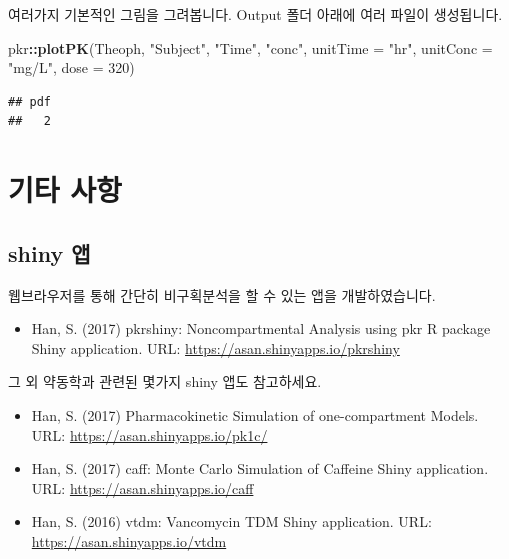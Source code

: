 \documentclass[12pt,]{krantz}
\newenvironment{Shaded}{\begin{snugshade}}{\end{snugshade}}
\newcommand{\KeywordTok}[1]{\textcolor[rgb]{0.13,0.29,0.53}{\textbf{#1}}}
\newcommand{\DataTypeTok}[1]{\textcolor[rgb]{0.13,0.29,0.53}{#1}}
\newcommand{\DecValTok}[1]{\textcolor[rgb]{0.00,0.00,0.81}{#1}}
\newcommand{\StringTok}[1]{\textcolor[rgb]{0.31,0.60,0.02}{#1}}
\newcommand{\OperatorTok}[1]{\textcolor[rgb]{0.81,0.36,0.00}{\textbf{#1}}}
\newcommand{\NormalTok}[1]{#1}
\providecommand{\tightlist}{%
  \setlength{\itemsep}{0pt}\setlength{\parskip}{0pt}}
\begin{document}
여러가지 기본적인 그림을 그려봅니다. Output 폴더 아래에 여러 파일이
생성됩니다.

\begin{Shaded}
\begin{Highlighting}[]
\NormalTok{pkr}\OperatorTok{::}\KeywordTok{plotPK}\NormalTok{(Theoph, }\StringTok{"Subject"}\NormalTok{, }\StringTok{"Time"}\NormalTok{, }\StringTok{"conc"}\NormalTok{, }
            \DataTypeTok{unitTime =} \StringTok{"hr"}\NormalTok{, }\DataTypeTok{unitConc =} \StringTok{"mg/L"}\NormalTok{, }\DataTypeTok{dose =} \DecValTok{320}\NormalTok{)}
\end{Highlighting}
\end{Shaded}

\begin{verbatim}
## pdf 
##   2
\end{verbatim}

\hypertarget{etc}{%
\chapter{기타 사항}\label{etc}}

\hypertarget{shiny-}{%
\section{shiny 앱}\label{shiny-}}

웹브라우저를 통해 간단히 비구획분석을 할 수 있는 앱을 개발하였습니다.

\begin{itemize}
\tightlist
\item
  Han, S. (2017) pkrshiny: Noncompartmental Analysis using pkr R package
  Shiny application. URL: \url{https://asan.shinyapps.io/pkrshiny}
\end{itemize}

그 외 약동학과 관련된 몇가지 shiny 앱도 참고하세요.

\begin{itemize}
\tightlist
\item
  Han, S. (2017) Pharmacokinetic Simulation of one-compartment Models.
  URL: \url{https://asan.shinyapps.io/pk1c/}
\item
  Han, S. (2017) caff: Monte Carlo Simulation of Caffeine Shiny
  application. URL: \url{https://asan.shinyapps.io/caff}
\item
  Han, S. (2016) vtdm: Vancomycin TDM Shiny application. URL:
  \url{https://asan.shinyapps.io/vtdm}
\end{itemize}
\end{document}
